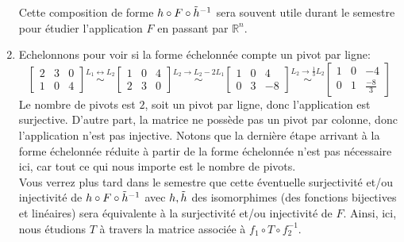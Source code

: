 \documentclass{article}
\newcommand{\R}{\mathbb{R}}
\begin{document}
\begin{enumerate}
    \noindent Cette composition de forme $h \circ F \circ \Tilde{h}^{-1}$ sera souvent utile durant le semestre pour étudier l'application $F$ en passant par $\R^n$.
    \item Echelonnons pour voir si la forme échelonnée compte un pivot par ligne:
    $$\begin{bmatrix} 
    2 & 3 & 0 \\ 
    1 & 0 & 4 
    \end{bmatrix} \overset{L_{1} \leftrightarrow L_{2}}{\sim} 
    \begin{bmatrix} 
    1 & 0 & 4 \\ 
    2 & 3 & 0 
    \end{bmatrix} \overset{L_{2} \rightarrow L_{2}-2L_{1}}{\sim} 
    \begin{bmatrix} 
    1 & 0 & 4 \\ 
    0 & 3 & -8 
    \end{bmatrix} \overset{L_{2} \rightarrow \frac{1}{3}L_2}{\sim}
    \begin{bmatrix} 
    1 & 0 & -4 \\ 
    0 & 1 & \frac{-8}{3} 
    \end{bmatrix}$$
    Le nombre de pivots est $2$, soit un pivot par ligne, donc l'application est surjective. D'autre part, la matrice ne possède pas un pivot par colonne, donc l'application n'est pas injective. Notons que la dernière étape arrivant à la forme échelonnée réduite à partir de la forme échelonnée n'est pas nécessaire ici, car tout ce qui nous importe est le nombre de pivots. \\
    
    \noindent Vous verrez plus tard dans le semestre que cette éventuelle surjectivité et/ou injectivité de $h \circ F \circ \Tilde{h}^{-1}$ avec $h, \Tilde{h}$ des isomorphimes (des fonctions bijectives et linéaires) sera équivalente à la surjectivité et/ou injectivité de $F$. Ainsi, ici, nous étudions $T$ à travers la matrice associée à $f_1 \circ T \circ f_2^{-1}$. \\
    
\end{enumerate}
\end{document}
